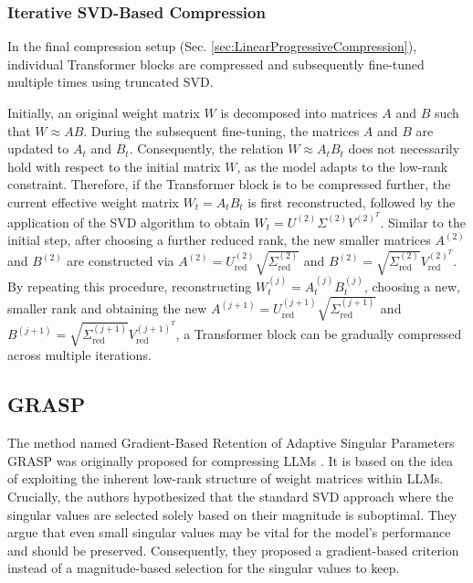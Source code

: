 \subsubsection{Iterative SVD-Based Compression}
\label{sec:IterativeRepeatedSVDCompression}
In the final compression setup (Sec. \ref{sec:LinearProgressiveCompression}), individual Transformer blocks are compressed and subsequently fine-tuned multiple times using truncated \gls{SVD}.

 Initially, an original weight matrix $W$ is decomposed into matrices $A$ and $B$ such that $W \approx AB$. During the subsequent fine-tuning, the matrices $A$ and $B$ are updated to $A_t$ and $B_t$. Consequently, the relation $W \approx A_tB_t$ does not necessarily hold with respect to the initial matrix $W$, as the model adapts to the low-rank constraint. Therefore, if the Transformer block is to be compressed further, the current effective weight matrix $W_t = A_t B_t$ is first reconstructed, followed by the application of the \gls{SVD} algorithm to obtain $W_t = U^{(2)} \Sigma^{(2)} V^{(2)^T}$. Similar to the initial step, after choosing a further reduced rank, the new smaller matrices $A^{(2)}$ and $B^{(2)}$ are constructed via $A^{(2)} = U^{(2)}_\text{red} \sqrt{\Sigma_\text{red}^{(2)}}$  and $B^{(2)} =  \sqrt{\Sigma_\text{red}^{(2)}}V_\text{red}^{(2)^T}$.  By repeating this procedure, reconstructing $W^{(j)}_t = A^{(j)}_t B^{(j)}_t$, choosing a new, smaller rank and obtaining the new $A^{(j+1)} = U^{(j+1)}_\text{red} \sqrt{\Sigma_\text{red}^{(j+1)}}$  and $B^{(j+1)} =  \sqrt{\Sigma_\text{red}^{(j+1)}}V_\text{red}^{(j+1)^T}$, a Transformer block can be gradually compressed across multiple iterations.


\subsection{GRASP}
\label{sec:GRASP}
The method named Gradient-Based Retention of Adaptive Singular Parameters \gls{GRASP} was originally proposed for compressing \gls{LLM}s \cite{GRASP}. It is based on the idea of exploiting the inherent low-rank structure of weight matrices within \gls{LLM}s. Crucially, the authors hypothesized that the standard \gls{SVD} approach where the singular values are selected solely based on their magnitude is suboptimal. They argue that even small singular values may be vital for the model's performance and should be preserved. Consequently, they proposed a gradient-based criterion instead of a magnitude-based selection for the singular values to keep.

